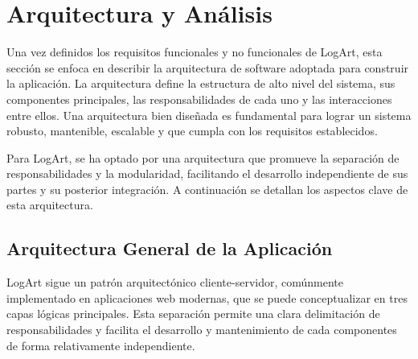 \section{Arquitectura y Análisis}
\label{sec:arquitectura}

Una vez definidos los requisitos funcionales y no funcionales de LogArt, esta sección se enfoca en describir la arquitectura de software adoptada para construir la aplicación. La arquitectura define la estructura de alto nivel del sistema, sus componentes principales, las responsabilidades de cada uno y las interacciones entre ellos. Una arquitectura bien diseñada es fundamental para lograr un sistema robusto, mantenible, escalable y que cumpla con los requisitos establecidos.

Para LogArt, se ha optado por una arquitectura que promueve la separación de responsabilidades y la modularidad, facilitando el desarrollo independiente de sus partes y su posterior integración. A continuación se detallan los aspectos clave de esta arquitectura.

\subsection{Arquitectura General de la Aplicación}
\label{ssec:arquitecturaGeneral}

LogArt sigue un patrón arquitectónico cliente-servidor, comúnmente implementado en aplicaciones web modernas, que se puede conceptualizar en tres capas lógicas principales. Esta separación permite una clara delimitación de responsabilidades y facilita el desarrollo y mantenimiento de cada componentes de forma relativamente independiente.

